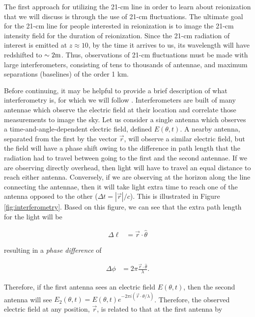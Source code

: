 The first approach for utilizing the 21-cm line in order to learn about reionization that we will discuss is through the use of 21-cm fluctuations. The ultimate goal for the 21-cm line for people interested in reionization is to image the 21-cm intensity field for the duration of reionization. Since the 21-cm radiation of interest is emitted at $z \approx 10$, by the time it arrives to us, its wavelength will have redshifted to $\sim 2\meter$. Thus, observations of 21-cm fluctuations must be made with large interferometers, consisting of tens to thousands of antennae, and maximum separations (baselines) of the order 1 km. 

Before continuing, it may be helpful to provide a brief description of what interferometry is, for which we will follow \citet{morales2009reionization}. Interferometers are built of many antennae which observe the electric field at their location and correlate those measurements to image the sky. Let us consider a single antenna which observes a time-and-angle-dependent electric field, defined $E(\theta,t)$. A nearby antenna, separated from the first by the vector $\vec{r}$, will observe a similar electric field, but the field will have a phase shift owing to the difference in path length that the radiation had to travel between going to the first and the second antennae. If we are observing directly overhead, then light will have to travel an equal distance to reach either antenna. Conversely, if we are observing at the horizon along the line connecting the antennae, then it will take light extra time to reach one of the antenna opposed to the other ($\Delta t = |\vec{r}|/c$). This is illustrated in Figure \ref{fig:interferometry}. Based on this figure, we can see that the extra path length for the light will be 

\begin{align}
\Delta \ell &= \vec{r}\cdot\hat{\theta}
\end{align}

resulting in a \textit{phase difference} of 

\begin{align}
\Delta \phi &= 2\pi \frac{\vec{r}\cdot\hat{\theta}}{\lambda}.
\end{align}


Therefore, if the first antenna sees an electric field $E(\theta,t)$, then the second antenna will see $E_2(\theta,t) = E(\theta,t)e^{-2\pi i (\vec{r}\cdot{\theta}/\lambda)}$. Therefore, the observed electric field at any position, $\vec{r}$, is related to that at the first antenna by

